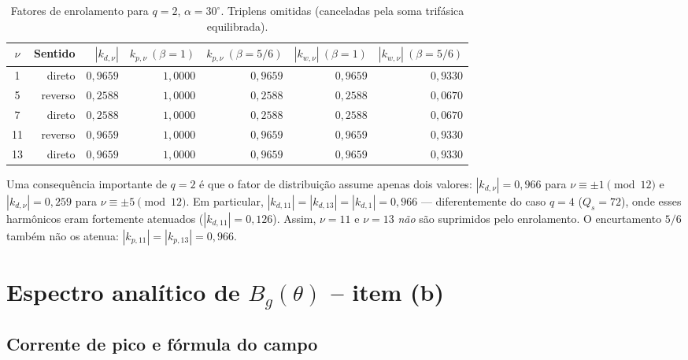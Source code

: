 \documentclass[12pt,a4paper]{article}
\begin{document}
\begin{table}[h!]
\vspace{-1pt}\centering\small
\caption{Fatores de enrolamento para $q{=}2$, $\alpha{=}30^{\circ}$.
         Triplens omitidas (canceladas pela soma trifásica equilibrada).}
\label{tab:fatores}
\setlength{\tabcolsep}{5pt}
\begin{tabular}{crrrrrr}
\toprule
$\nu$ & Sentido & $|k_{d,\nu}|$ & $k_{p,\nu}\ (\beta{=}1)$
      & $k_{p,\nu}\ (\beta{=}5/6)$
      & $|k_{w,\nu}|\ (\beta{=}1)$ & $|k_{w,\nu}|\ (\beta{=}5/6)$\\
\midrule
 1 & direto  & $0{,}9659$ & $1{,}0000$ & $0{,}9659$ & $0{,}9659$ & $0{,}9330$\\
 5 & reverso & $0{,}2588$ & $1{,}0000$ & $0{,}2588$ & $0{,}2588$ & $0{,}0670$\\
 7 & direto  & $0{,}2588$ & $1{,}0000$ & $0{,}2588$ & $0{,}2588$ & $0{,}0670$\\
11 & reverso & $0{,}9659$ & $1{,}0000$ & $0{,}9659$ & $0{,}9659$ & $0{,}9330$\\
13 & direto  & $0{,}9659$ & $1{,}0000$ & $0{,}9659$ & $0{,}9659$ & $0{,}9330$\\
\bottomrule
\end{tabular}
\end{table}

Uma consequência importante de $q{=}2$ é que o fator de distribuição assume
apenas dois valores: $|k_{d,\nu}|{=}0{,}966$ para $\nu\equiv\pm1\pmod{12}$
e $|k_{d,\nu}|{=}0{,}259$ para $\nu\equiv\pm5\pmod{12}$.
Em particular, $|k_{d,11}|{=}|k_{d,13}|{=}|k_{d,1}|{=}0{,}966$ ---
diferentemente do caso $q{=}4$ ($Q_s{=}72$), onde esses harmônicos eram
fortemente atenuados ($|k_{d,11}|{=}0{,}126$).
Assim, $\nu{=}11$ e $\nu{=}13$ \emph{não} são suprimidos pelo enrolamento.
O encurtamento $5/6$ também não os atenua: $|k_{p,11}|{=}|k_{p,13}|{=}0{,}966$.

\section{Espectro analítico de $B_g(\theta)$ -- item (b)}

\subsection*{Corrente de pico e fórmula do campo}
\end{document}
